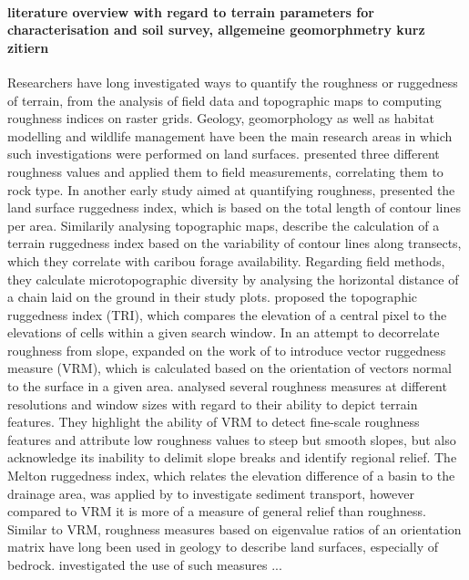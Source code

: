 \documentclass[preprint,12pt,authoryear]{elsarticle}
\begin{document}
\paragraph{literature overview with regard to terrain parameters for characterisation and soil survey, allgemeine geomorphmetry kurz zitiern}
Researchers have long investigated ways to quantify the roughness or ruggedness of terrain, from the analysis of field data and topographic maps to computing roughness indices on raster grids. Geology, geomorphology as well as habitat modelling and wildlife management have been the main research areas in which such investigations were performed on land surfaces.  \cite{Hobson1972} presented three different roughness values and applied them to field measurements, correlating them to rock type. In another early study aimed at quantifying roughness, \cite{Beasom1983} presented the land surface ruggedness index, which is based on the total length of contour lines per area. Similarily analysing topographic maps, \cite{Nellemann1994} describe the calculation of a terrain ruggedness index based on the variability of contour lines along transects, which they correlate with caribou forage availability. Regarding field methods, they calculate microtopographic diversity by analysing the horizontal distance of a chain laid on the ground in their study plots. \cite{Riley1999} proposed the topographic ruggedness index (TRI), which compares the elevation of a central pixel to the elevations of cells within a given search window. In an attempt to decorrelate roughness from slope, \cite{Sappington2007} expanded on the work of \cite{Hobson1972} to introduce vector ruggedness measure (VRM), which is calculated based on the orientation of vectors normal to the surface in a given area. \citep{Grohmann2010} analysed several roughness measures at different resolutions and window sizes with regard to their ability to depict terrain features. They highlight the ability of VRM to detect fine-scale roughness features and attribute low roughness values to steep but smooth slopes, but also acknowledge its inability to delimit slope breaks and identify regional relief. The Melton ruggedness index, which relates  the elevation difference of a basin to the drainage area, was applied by \cite{Marchi2005} to investigate sediment transport, however compared to VRM  it is more of a measure of general relief than roughness. Similar to VRM, roughness measures based on eigenvalue ratios of an orientation matrix have long been used in geology to describe land surfaces, especially of bedrock. \cite{Coblentz2014} investigated the use of such measures ...
\end{document}
